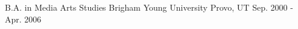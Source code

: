 
\begin{cventries}

  \cventry
    {B.A. in Media Arts Studies} %
    {Brigham Young University} %
    {Provo, UT} %
    {Sep. 2000 - Apr. 2006} %
    {}

\end{cventries}
